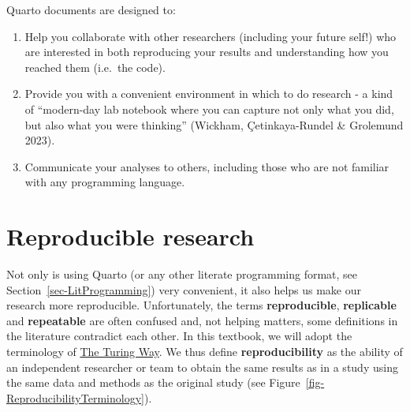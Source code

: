 \documentclass[
  letterpaper,
  DIV=11,
  numbers=noendperiod]{scrreprt}
\begin{document}
\begin{tcolorbox}[enhanced jigsaw, arc=.35mm, bottomrule=.15mm, bottomtitle=1mm, breakable, colback=white, colbacktitle=quarto-callout-important-color!10!white, colframe=quarto-callout-important-color-frame, coltitle=black, left=2mm, leftrule=.75mm, opacityback=0, opacitybacktitle=0.6, rightrule=.15mm, title=\textcolor{quarto-callout-important-color}{\faExclamation}\hspace{0.5em}{In brief}, titlerule=0mm, toprule=.15mm, toptitle=1mm]

Quarto documents are designed to:

\begin{enumerate}
\def\labelenumi{\arabic{enumi}.}
\item
  Help you collaborate with other researchers (including your future
  self!) who are interested in both reproducing your results and
  understanding how you reached them (i.e.~the code).
\item
  Provide you with a convenient environment in which to do research - a
  kind of ``modern-day lab notebook where you can capture not only what
  you did, but also what you were thinking'' (Wickham, Çetinkaya-Rundel
  \& Grolemund 2023).
\item
  Communicate your analyses to others, including those who are not
  familiar with any programming language.
\end{enumerate}

\end{tcolorbox}

\section{Reproducible research}\label{sec-Reproducibility}

Not only is using Quarto (or any other literate programming format, see
Section~\ref{sec-LitProgramming}) very convenient, it also helps us make
our research more reproducible. Unfortunately, the terms
\textbf{reproducible}, \textbf{replicable} and \textbf{repeatable} are
often confused and, not helping matters, some definitions in the
literature contradict each other. In this textbook, we will adopt the
terminology of \href{https://book.the-turing-way.org/}{The Turing Way}.
We thus define \textbf{reproducibility} as the ability of an independent
researcher or team to obtain the same results as in a study using the
same data and methods as the original study (see
Figure~\ref{fig-ReproducibilityTerminology}).
\end{document}
